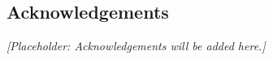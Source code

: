 \begin{otherlanguage}{english}
\chapter{Acknowledgements}
\label{front:acknowledgements}

\noindent\textit{[Placeholder: Acknowledgements will be added here.]}
\end{otherlanguage}
